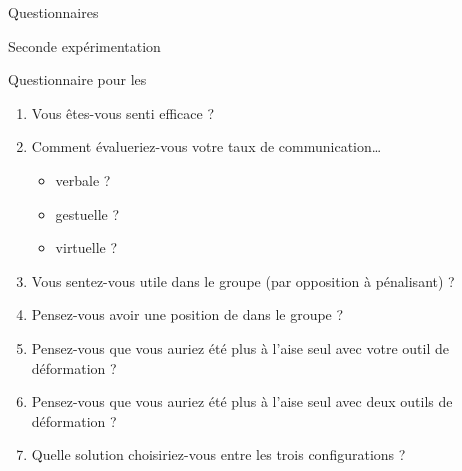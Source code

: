 \documentclass[myfrancais,ngerman,english,frenchb]{mythesis}
\begin{document}
\begin{mychapter}{Questionnaires}
\begin{mysection}{Seconde expérimentation}
\begin{mysubsection}{Questionnaire pour les }
\begin{enumerate}
					\item Vous êtes-vous senti efficace ?
					\item Comment évalueriez-vous votre taux de communication\dots{}
						\begin{itemize}
							\item verbale ?
							\item gestuelle ?
							\item virtuelle ?
						\end{itemize}
					\item Vous sentez-vous utile dans le groupe (par opposition à pénalisant) ?
					\item Pensez-vous avoir une position de  dans le groupe ?
					\item Pensez-vous que vous auriez été plus à l'aise seul avec votre outil de déformation ?
					\item Pensez-vous que vous auriez été plus à l'aise seul avec deux outils de déformation ?
					\item Quelle solution choisiriez-vous entre les trois configurations ?
				\end{enumerate}


\end{mysubsection}
\end{mysection}
\end{mychapter}
\end{document}
